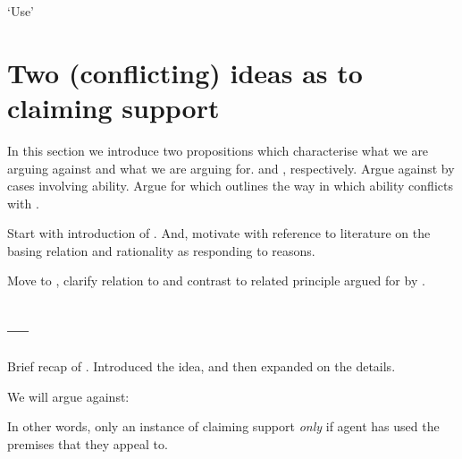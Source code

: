 \begin{note}[`Use']
  `Use'
\end{note}

\section{Two (conflicting) ideas as to claiming support}
\label{sec:inter-with-claim}

\begin{note}
  In this section we introduce two propositions which characterise what we are arguing against and what we are arguing for.
   and , respectively.
  Argue against \ESU{} by cases involving ability.
  Argue for \EAS{} which outlines the way in which ability conflicts with \ESU{}.

  Start with introduction of \ESU{}.
  And, motivate with reference to literature on the basing relation and rationality as responding to reasons.

  Move to \EAS{}, clarify relation to \ESU{} and contrast to related principle argued for by \citeauthor{Moretti:2019wx}.
\end{note}

\subsection{ --- \ESU{}}
\label{sec:esu}

\begin{note}
  Brief recap of \USE{}.
  Introduced the idea, and then expanded on the details.
\end{note}

\begin{note}[Focus]
  We will argue against:

  \targetESU*

  In other words, only an instance of claiming support \emph{only} if agent has used the premises that they appeal to.
\end{note}

